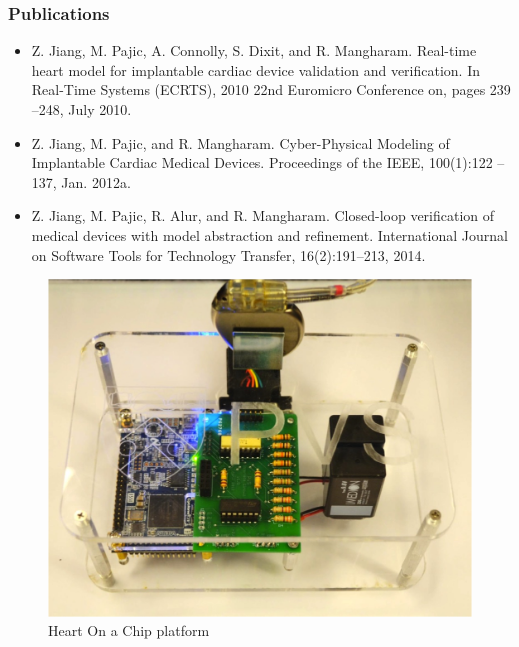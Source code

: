 \documentclass[a4paper]{article}
\begin{document}
\subsubsection{Publications} 
\begin{itemize}
\item Z. Jiang, M. Pajic, A. Connolly, S. Dixit, and R. Mangharam. Real-time heart model
for implantable cardiac device validation and verification. In Real-Time Systems
(ECRTS), 2010 22nd Euromicro Conference on, pages 239 –248, July 2010.
\item Z. Jiang, M. Pajic, and R. Mangharam. Cyber-Physical Modeling of Implantable
Cardiac Medical Devices. Proceedings of the IEEE, 100(1):122 –137, Jan. 2012a.
\item Z. Jiang, M. Pajic, R. Alur, and R. Mangharam. Closed-loop verification of medical
devices with model abstraction and refinement. International Journal on Software
Tools for Technology Transfer, 16(2):191–213, 2014.
\end{itemize}
\begin{figure}[t]
	\centering
	\includegraphics[scale=0.55]{figs/HOC.png}
	\caption{\small Heart On a Chip platform}
	\label{fig:HOC}
\end{figure}


\newpage
\end{document}
